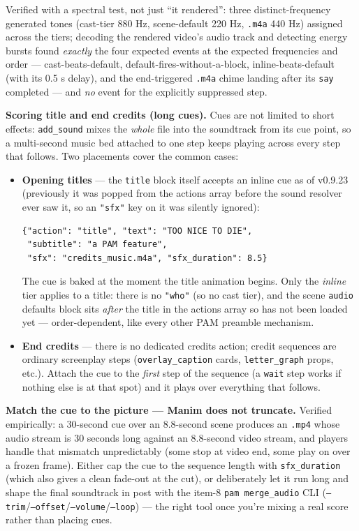 \documentclass[
  12pt,
  letterpaper,
]{book}
\begin{document}
Verified with a spectral test, not just ``it rendered'': three
distinct-frequency generated tones (cast-tier 880 Hz, scene-default
220 Hz, \texttt{.m4a} 440 Hz) assigned across the tiers; decoding the
rendered video's audio track and detecting energy bursts found
\emph{exactly} the four expected events at the expected frequencies
and order --- cast-beats-default, default-fires-without-a-block,
inline-beats-default (with its 0.5 s delay), and the end-triggered
\texttt{.m4a} chime landing after its \texttt{say} completed --- and
\emph{no} event for the explicitly suppressed step.

\textbf{Scoring title and end credits (long cues).} Cues are not
limited to short effects: \texttt{add\_sound} mixes the \emph{whole}
file into the soundtrack from its cue point, so a multi-second music
bed attached to one step keeps playing across every step that
follows. Two placements cover the common cases:

\begin{itemize}
\item
  \textbf{Opening titles} --- the \texttt{title} block itself accepts
  an inline cue as of v0.9.23 (previously it was popped from the
  actions array before the sound resolver ever saw it, so an
  \texttt{"sfx"} key on it was silently ignored):

\begin{verbatim}
{"action": "title", "text": "TOO NICE TO DIE",
 "subtitle": "a PAM feature",
 "sfx": "credits_music.m4a", "sfx_duration": 8.5}
\end{verbatim}

  The cue is baked at the moment the title animation begins. Only the
  \emph{inline} tier applies to a title: there is no \texttt{"who"}
  (so no cast tier), and the scene \texttt{audio} defaults block sits
  \emph{after} the title in the actions array so has not been loaded
  yet --- order-dependent, like every other PAM preamble mechanism.
\item
  \textbf{End credits} --- there is no dedicated credits action;
  credit sequences are ordinary screenplay steps
  (\texttt{overlay\_caption} cards, \texttt{letter\_graph} props,
  etc.). Attach the cue to the \emph{first} step of the sequence (a
  \texttt{wait} step works if nothing else is at that spot) and it
  plays over everything that follows.
\end{itemize}

\textbf{Match the cue to the picture --- Manim does not truncate.}
Verified empirically: a 30-second cue over an 8.8-second scene
produces an \texttt{.mp4} whose audio stream is 30 seconds long
against an 8.8-second video stream, and players handle that mismatch
unpredictably (some stop at video end, some play on over a frozen
frame). Either cap the cue to the sequence length with
\texttt{sfx\_duration} (which also gives a clean fade-out at the cut),
or deliberately let it run long and shape the final soundtrack in
post with the item-8 \texttt{pam merge\_audio} CLI
(\texttt{--trim}/\texttt{--offset}/\texttt{--volume}/\texttt{--loop})
--- the right tool once you're mixing a real score rather than
placing cues.
\end{document}
